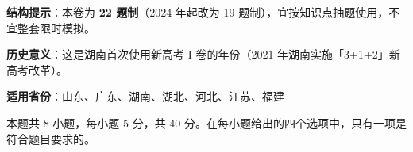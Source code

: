 

\begin{gknotice}
\textbf{结构提示}：本卷为 \textbf{22 题制}（2024 年起改为 19 题制），宜按知识点抽题使用，不宜整套限时模拟。

\textbf{历史意义}：这是湖南首次使用新高考 I 卷的年份（2021 年湖南实施「3+1+2」新高考改革）。

\textbf{适用省份}：山东、广东、湖南、湖北、河北、江苏、福建
\end{gknotice}

\par\medskip


\begin{gktip}
本题共 8 小题，每小题 5 分，共 40 分。在每小题给出的四个选项中，只有一项是符合题目要求的。
\end{gktip}

